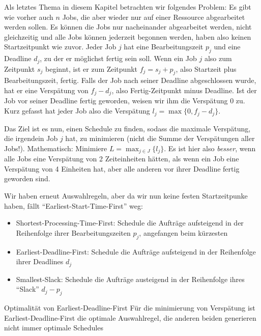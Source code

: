 \documentclass{panikzettel}
\begin{document}
Als letztes Thema in diesem Kapitel betrachten wir folgendes Problem: Es gibt wie vorher auch $n$ Jobs, die aber wieder nur auf einer Ressource abgearbeitet werden sollen. Es können die Jobs nur nacheinander abgearbeitet werden, nicht gleichzeitig und alle Jobs können jederzeit begonnen werden, haben also keinen Startzeitpunkt wie zuvor. Jeder Job $j$ hat eine Bearbeitungszeit $p_j$ und eine Deadline $d_j$, zu der er möglichst fertig sein soll. Wenn ein Job $j$ also zum Zeitpunkt $s_j$ beginnt, ist er zum Zeitpunkt $f_j = s_j + p_j$, also Startzeit plus Bearbeitungszeit, fertig. Falls der Job nach seiner Deadline abgeschlossen wurde, hat er eine Verspätung von $f_j - d_j$, also Fertig-Zeitpunkt minus Deadline. Ist der Job vor seiner Deadline fertig geworden, weisen wir ihm die Verspätung 0 zu. Kurz gefasst hat jeder Job also die Verspätung $l_j = \max \{0, f_j - d_j\}$.  

Das Ziel ist es nun, einen Schedule zu finden, sodass die maximale Verspätung, die irgendein Job $j$ hat, zu minimieren (nicht die Summe der Verspätungen aller Jobs!). Mathematisch: Minimiere $L = \max_{j \in J} \{l_j\}$. Es ist hier also \emph{besser}, wenn alle Jobs eine Verspätung von 2 Zeiteinheiten hätten, als wenn ein Job eine Verspätung von 4 Einheiten hat, aber alle anderen vor ihrer Deadline fertig geworden sind. 

Wir haben erneut Auswahlregeln, aber da wir nun keine festen Startzeitpunke haben, fällt ``Earliest-Start-Time-First'' weg:

\begin{itemize}
	\item Shortest-Processing-Time-First: Schedule die Aufträge aufsteigend in der Reihenfolge ihrer Bearbeitungszeiten $p_j$, angefangen beim kürzesten
	\item Earliest-Deadline-First: Schedule die Aufträge aufsteigend in der Reihenfolge ihrer Deadlines $d_j$
	\item Smallest-Slack: Schedule die Aufträge austeigend in der Reihenfolge ihres ``Slack'' $d_j - p_j$
\end{itemize} 

\begin{theo}{Optimalität von Earliest-Deadline-First}
	Für die minimierung von Verspätung ist Earliest-Deadline-First die optimale Auswahlregel, die anderen beiden generieren nicht immer optimale Schedules
\end{theo}
\end{document}
